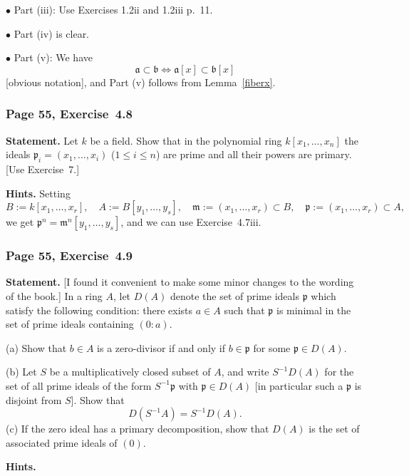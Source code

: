 \documentclass[12pt,letterpaper]{article}%
\newcommand{\mf}{\mathfrak}
\newcommand{\aaa}{\mf a}
\newcommand{\bbb}{\mf b}
\newcommand{\mmm}{\mf m}
\newcommand{\ppp}{\mf p}
\newcommand{\bu}{\bullet}
\newcommand{\nn}{\noindent}
\begin{document}
\nn$\bu$ Part (iii): Use Exercises 1.2ii and 1.2iii p.~11.%

\nn$\bu$ Part (iv) is clear.

\nn$\bu$ Part (v): We have 
\begin{equation}\label{asb}
\aaa\subset\bbb\iff\aaa[x]\subset\bbb[x]
\end{equation}
[obvious notation], and Part (v) follows from Lemma~\ref{fiberx}. 

\subsubsection{Page 55, Exercise~4.8}%

\textbf{Statement.} Let $k$ be a field. Show that in the polynomial ring $k[x_1,\ldots,x_n]$ the ideals $\ppp_i=(x_1,\ldots,x_i)$ ($1\le i\le n$) are prime and all their powers are primary. [Use Exercise~7.]

\nn\textbf{Hints.} Setting 
$$
B:=k[x_1,\dots,x_r],\quad A:=B[y_1,\dots,y_s],\quad\mmm:=(x_1,\dots,x_r)\subset B,\quad\ppp:=(x_1,\dots,x_r)\subset A,
$$ 
we get $\ppp^n=\mmm^n[y_1,\dots,y_s]$, and we can use Exercise~4.7iii.%

\subsubsection{Page 55, Exercise~4.9}\label{ex4.9}%

\textbf{Statement.} [I found it convenient to make some minor changes to the wording of the book.] In a ring $A$, let $D(A)$ denote the set of prime ideals $\ppp$ which satisfy the following condition: there exists $a\in A$ such that $\ppp$ is minimal in the set of prime ideals containing $(0:a)$. 

\nn(a) Show that $b\in A$ is a zero-divisor if and only if $b\in\ppp$ for some $\ppp\in D(A)$.

\nn(b) Let $S$ be a multiplicatively closed subset of $A$, and write $S^{-1}D(A)$ for the set of all prime ideals of the form $S^{-1}\ppp$ with $\ppp\in D(A)$ [in particular such a $\ppp$ is disjoint from $S$]. Show that
$$
D(S^{-1}A)=S^{-1}D(A).
$$
(c) If the zero ideal has a primary decomposition, show that $D(A)$ is the set of associated prime ideals of $(0)$.

\nn\textbf{Hints.} 
\end{document}
